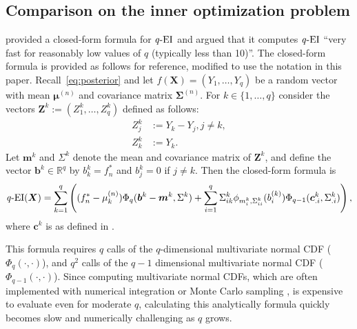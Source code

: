 \documentclass[paper=letter]{scrartcl}
\newcommand{\bmu}[1]{\bm{\mu}^{(#1)}}
\newcommand{\Sig}[1]{\bm{\Sigma}^{(#1)}} %
\newcommand{\qEI}{\text{\textit q-EI}}
\begin{document}
\subsection{Comparison on the inner optimization problem} \label{sec:exact}
\cite{chevalier2013fast} provided a closed-form formula for $\qEI$ and argued that it computes $\qEI$ 
\enquote{very fast for reasonably low values of $q$ (typically less than 10)}. The closed-form formula is
provided as follows for reference, modified to use the notation in this paper.
Recall~\eqref{eq:posterior} and let $f(\bm{X}) = (Y_1, \ldots, Y_q)$ be a random vector with mean $\bmu{n}$ and covariance matrix $\Sig{n}$. For $k \in \{1, \ldots, q\}$ consider the vectors $\bm{Z}^k := (Z_1^k, \ldots, Z_q^k)$ defined as follows:
\begin{equation*}
\begin{split}
Z_j^k &:= Y_k - Y_j, j \neq k, \\
Z_k^k &:= Y_k.
\end{split}
\end{equation*}
Let $\bm{m}^k$ and $\Sigma^k$ denote the mean and covariance matrix of $\bm{Z}^k$, and define the vector $\bm{b}^k \in \mathbb{R}^q$ by $b_k^k = f_n^*$ and $b_j^k = 0$ if $j \neq k$. Then the closed-form formula is
\begin{equation}
\qEI(\bm{X}) = \sum_{k=1}^q \left( (f_n^* - \mu_k^{(n)}) \Phi_q(\bm{b}^{k}-\bm{m}^{k}, \Sigma^{k}) + \sum_{i=1}^q \Sigma_{ik}^{k} \phi_{m_i^{k}, \Sigma_{ii}^{k}}(b_i^{(k)}) \Phi_{q-1} (\bm{c}_{.i}^{k}, \Sigma_{.i}^{k}) \right),
\label{eq:fast_ei}
\end{equation}
where $\bm{c}^{k}$ is as defined in \cite{chevalier2013fast}.

This formula requires $q$ calls of the $q$-dimensional multivariate normal CDF ($\Phi_q(\cdot, \cdot)$), and $q^2$ calls of the $q-1$ dimensional multivariate normal CDF ($\Phi_{q-1}(\cdot, \cdot)$). Since computing multivariate normal CDFs, which are often implemented with numerical integration or Monte Carlo sampling \citep{genz1992numerical}, is expensive to evaluate even for moderate $q$, calculating this analytically formula quickly becomes slow and numerically challenging as $q$ grows.


\end{document}
